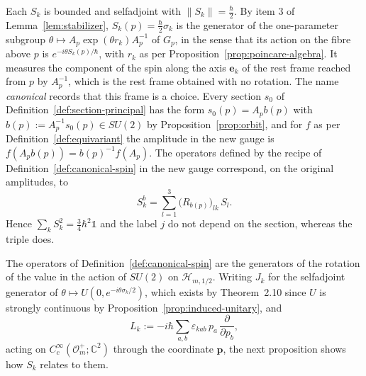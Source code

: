 \begin{remark}\label{rem:canonical-spin}
	Each $S_k$ is bounded and selfadjoint with $\|S_k\|=\frac\hbar2$. By item 3 of Lemma~\ref{lem:stabilizer}, $S_k(p)=\frac\hbar2\sigma_k$ is the generator of the one-parameter subgroup $\theta\mapsto A_p\exp(\theta r_k)A_p^{-1}$ of $G_p$, in the sense that its action on the fibre above $p$ is $e^{-i\theta S_k(p)/\hbar}$, with $r_k$ as per Proposition~\ref{prop:poincare-algebra}. It measures the component of the spin along the axis $\mathbf{e}_k$ of the rest frame reached from $p$ by $A_p^{-1}$, which is the rest frame obtained with no rotation. The name \emph{canonical} records that this frame is a choice. Every section $s_0$ of Definition~\ref{def:section-principal} has the form $s_0(p)=A_pb(p)$ with $b(p):=A_p^{-1}s_0(p)\in SU(2)$ by Proposition~\ref{prop:orbit}, and for $f$ as per Definition~\ref{def:equivariant} the amplitude in the new gauge is $f(A_pb(p))=b(p)^{-1}f(A_p)$. The operators defined by the recipe of Definition~\ref{def:canonical-spin} in the new gauge correspond, on the original amplitudes, to
	\begin{equation*}
		S^b_k=\sum_{l=1}^3\big(R_{b(p)}\big)_{lk}\,S_l.
	\end{equation*}
	Hence $\sum_kS_k^2=\frac34\hbar^2\mathbb{1}$ and the label $j$ do not depend on the section, whereas the triple does.
\end{remark}

The operators of Definition~\ref{def:canonical-spin} are the generators of the rotation of the value in the action of $SU(2)$ on $\mathcal{H}_{m,1/2}$. Writing $J_k$ for the selfadjoint generator of $\theta\mapsto U(0,e^{-i\theta\sigma_k/2})$, which exists by Theorem~2.10 since $U$ is strongly continuous by Proposition~\ref{prop:induced-unitary}, and
\begin{equation*}
	L_k:=-i\hbar\sum_{a,b}\varepsilon_{kab}\,p_a\,\frac{\partial}{\partial p_b},
\end{equation*}
acting on $C_c^\infty(\mathcal{O}_m^+;\mathbb{C}^2)$ through the coordinate $\mathbf{p}$, the next proposition shows how $S_k$ relates to them.

